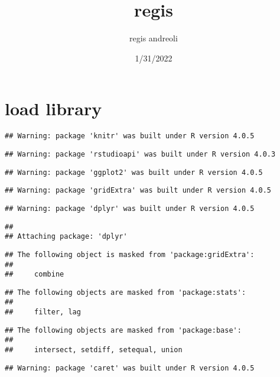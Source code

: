 \documentclass[
]{article}
\title{regis}
\author{regis andreoli}
\date{1/31/2022}
\begin{document}
\maketitle

{
\setcounter{tocdepth}{4}
\tableofcontents
}
\hypertarget{load-library}{%
\section{load library}\label{load-library}}

\begin{verbatim}
## Warning: package 'knitr' was built under R version 4.0.5
\end{verbatim}

\begin{verbatim}
## Warning: package 'rstudioapi' was built under R version 4.0.3
\end{verbatim}

\begin{verbatim}
## Warning: package 'ggplot2' was built under R version 4.0.5
\end{verbatim}

\begin{verbatim}
## Warning: package 'gridExtra' was built under R version 4.0.5
\end{verbatim}

\begin{verbatim}
## Warning: package 'dplyr' was built under R version 4.0.5
\end{verbatim}

\begin{verbatim}
## 
## Attaching package: 'dplyr'
\end{verbatim}

\begin{verbatim}
## The following object is masked from 'package:gridExtra':
## 
##     combine
\end{verbatim}

\begin{verbatim}
## The following objects are masked from 'package:stats':
## 
##     filter, lag
\end{verbatim}

\begin{verbatim}
## The following objects are masked from 'package:base':
## 
##     intersect, setdiff, setequal, union
\end{verbatim}

\begin{verbatim}
## Warning: package 'caret' was built under R version 4.0.5
\end{verbatim}
\end{document}
